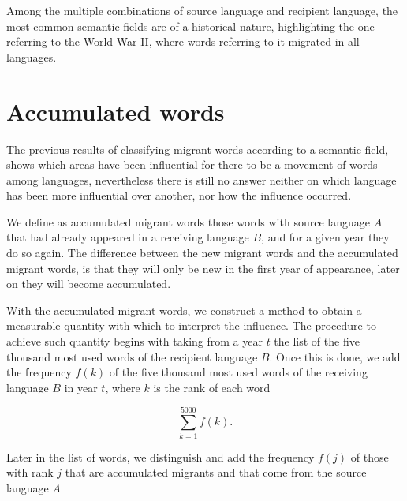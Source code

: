 \documentclass[10pt,letterpaper]{article} %
\begin{document}
Among the multiple combinations of source language and recipient language, the most common semantic fields are of a historical nature, highlighting the one referring to the World War II, where words referring to it migrated in all languages.



\section*{Accumulated words} %
The previous results of classifying migrant words according to a semantic field, shows which areas have been influential for there to be a movement of words among languages, nevertheless there is still no answer neither on which language has been more influential over another, nor how the influence occurred.

We define as accumulated migrant words those words with source language $A$ that had already appeared in a receiving language $B$, and for a given year they do so again. The difference between the new migrant words and the accumulated migrant words, is that they will only be new in the first year of appearance, later on they will become accumulated.

With the accumulated migrant words, we construct a method to obtain a measurable quantity with which to interpret the influence. The procedure to achieve such quantity begins with taking from a year $t$ the list of the five thousand most used words of the recipient language $B$. Once this is done, we add the frequency $f(k)$ of the five thousand most used words of the receiving language $B$ in year $t$, where $k$ is the rank of each word

\begin{equation}
\label{ec.ftot}
\sum_{k=1}^{5000} f(k).
\end{equation}

Later in the list of words, we distinguish and add the frequency $f(j)$  of those with rank $j$ that are accumulated migrants and that come from the source language $A$
\end{document}
